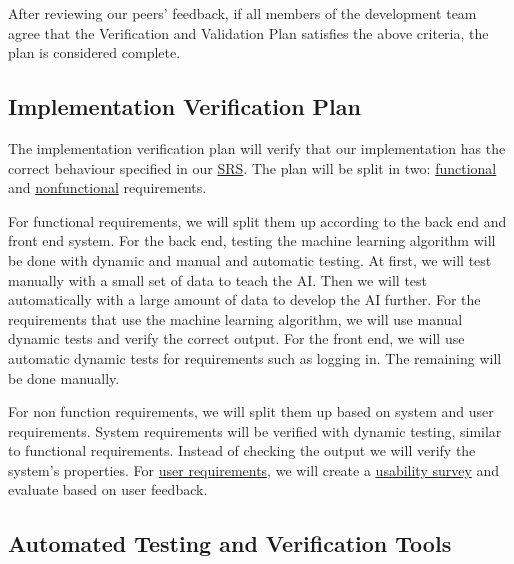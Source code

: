 \documentclass[12pt, titlepage]{article}
\begin{document}
After reviewing our peers' feedback, if all members of the development team
agree that the Verification and Validation Plan satisfies the above criteria,
the plan is considered complete.

\subsection{Implementation Verification Plan}
\label{sec:implementation}


  
The implementation verification plan will verify that our implementation has the
correct behaviour specified in our
\href{https://github.com/parkd-app/park-d/blob/main/docs/SRS/SRS.pdf}{SRS}. The
plan will be split in two: \hyperref[sec:5.1]{functional} and
\hyperref[sec:5.2]{nonfunctional} requirements.

For functional requirements, we will split them up according to the back end and
front end system. For the back end, testing the machine learning algorithm will
be done with dynamic and manual and automatic testing. At first, we will test
manually with a small set of data to teach the AI. Then we will test
automatically with a large amount of data to develop the AI further. For the
requirements that use the machine learning algorithm, we will use manual dynamic
tests and verify the correct output. For the front end, we will use automatic
dynamic tests for requirements such as logging in. The remaining will be done
manually.

For non function requirements, we will split them up based on system and user
requirements. System requirements will be verified with dynamic testing, similar
to functional requirements. Instead of checking the output we will verify the
system's properties. For \hyperref[sec:5.2.2]{user requirements}, we will create
a \hyperref[sec:7.2]{usability survey} and evaluate based on user feedback.

\subsection{Automated Testing and Verification Tools}
\label{sec:automation}
\end{document}
